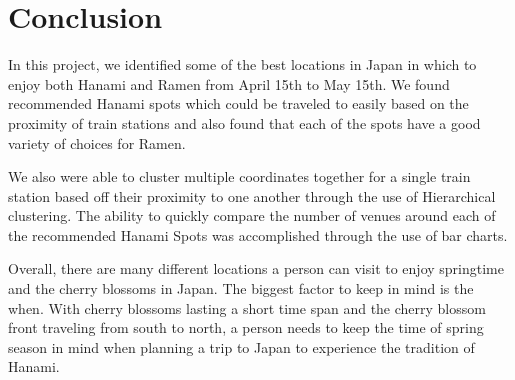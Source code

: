 \documentclass[11pt]{article}
\begin{document}
    \hypertarget{conclusion}{%
\section{Conclusion}}\label{conclusion}

    In this project, we identified some of the best locations in Japan in
which to enjoy both Hanami and Ramen from April 15th to May 15th. We
found recommended Hanami spots which could be traveled to easily based on the proximity
of train stations and also found that each of the spots have a good variety
of choices for Ramen.

We also were able to cluster multiple coordinates together for
a single train station based off their proximity to one another through the 
use of Hierarchical clustering. The ability to quickly compare the number of
venues around each of the recommended Hanami Spots was accomplished
through the use of bar charts.

Overall, there are many different locations a person can visit to enjoy
springtime and the cherry blossoms in Japan. The biggest factor to keep
in mind is the when. With cherry blossoms lasting a short time span and
the cherry blossom front traveling from south to north, a person needs
to keep the time of spring season in mind when planning a trip to Japan to
experience the tradition of Hanami.


    
    
    
\end{document}
